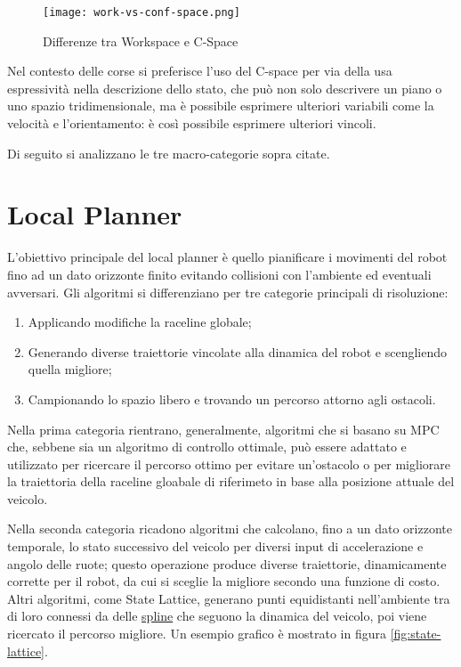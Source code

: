\begin{figure}[H]
	\begin{center}
		\texttt{[image: work-vs-conf-space.png]}
	\end{center}
	\caption{Differenze tra Workspace e C-Space \cite{lection11}}
	\label{fig:work-vs-conf-space}
\end{figure}

Nel contesto delle corse si preferisce l'uso del C-space per via della usa espressività nella descrizione
dello stato, che può non solo descrivere un piano o uno spazio tridimensionale, ma è possibile esprimere
ulteriori variabili come la velocità e l'orientamento: è così possibile esprimere ulteriori vincoli.

\bigskip
\noindent Di seguito si analizzano le tre macro-categorie sopra citate.

\section{Local Planner}
L'obiettivo principale del local planner è quello pianificare i movimenti del robot fino ad un dato
orizzonte finito evitando collisioni con l'ambiente ed eventuali avversari. Gli algoritmi si
differenziano per tre categorie principali di risoluzione:
\begin{enumerate}
	\item Applicando modifiche la raceline globale; 
	\item Generando diverse traiettorie vincolate alla dinamica del robot e scengliendo quella migliore;
	\item Campionando lo spazio libero e trovando un percorso attorno agli ostacoli.
\end{enumerate}
Nella prima categoria rientrano, generalmente, algoritmi che si basano su MPC che, sebbene sia un
algoritmo di controllo ottimale, può essere adattato e utilizzato per ricercare il percorso ottimo per
evitare un'ostacolo o per migliorare la traiettoria della raceline gloabale di riferimeto in base alla
posizione attuale del veicolo.

Nella seconda categoria ricadono algoritmi che calcolano, fino a un dato orizzonte temporale, lo stato
successivo del veicolo per diversi input di accelerazione e angolo delle ruote; questo operazione produce
diverse traiettorie, dinamicamente corrette per il robot, da cui si sceglie la migliore secondo una
funzione di costo. Altri algoritmi, come State Lattice, generano punti equidistanti nell'ambiente tra di
loro connessi da delle \hyperref[par:spline-def]{spline} che seguono la dinamica del veicolo, poi viene
ricercato il percorso migliore. Un esempio grafico è mostrato in figura \ref{fig:state-lattice}.

